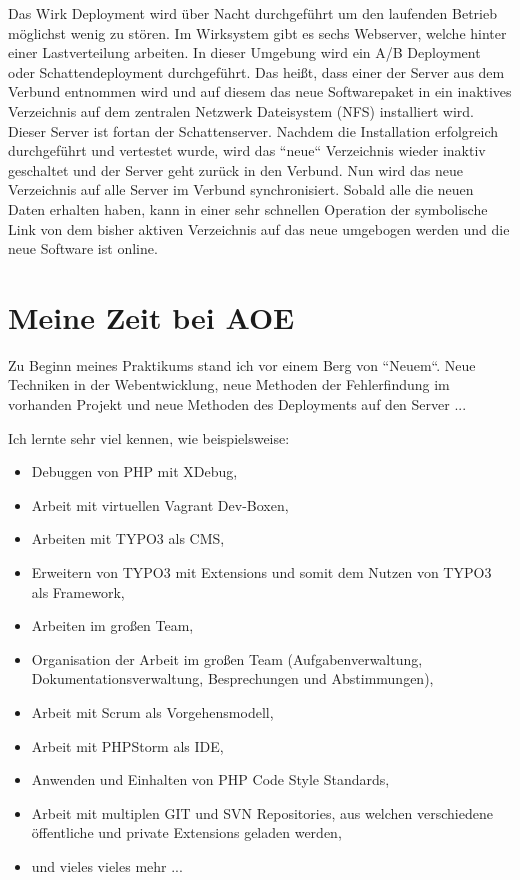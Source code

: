 \documentclass[11pt,a4paper]{article}
\begin{document}
Das Wirk Deployment wird über Nacht durchgeführt um den laufenden Betrieb möglichst wenig zu stören. Im Wirksystem gibt es sechs Webserver, welche hinter einer Lastverteilung arbeiten. In dieser Umgebung wird ein A/B Deployment oder Schattendeployment durchgeführt. Das heißt, dass einer der Server aus dem Verbund entnommen wird und auf diesem das neue Softwarepaket in ein inaktives Verzeichnis auf dem zentralen Netzwerk Dateisystem (NFS) installiert wird. Dieser Server ist fortan der Schattenserver. Nachdem die Installation erfolgreich durchgeführt und vertestet wurde, wird das “neue“ Verzeichnis wieder inaktiv geschaltet und der Server geht zurück in den Verbund. Nun wird das neue Verzeichnis auf alle Server im Verbund synchronisiert. Sobald alle die neuen Daten erhalten haben, kann in einer sehr schnellen Operation der symbolische Link von dem bisher aktiven Verzeichnis auf das neue umgebogen werden und die neue Software ist online.


\section{Meine Zeit bei AOE } \label{sec:pipeline}

Zu Beginn meines Praktikums stand ich vor einem Berg von “Neuem“.
Neue Techniken in der Webentwicklung,
neue Methoden der Fehlerfindung im vorhanden Projekt und
neue Methoden des Deployments auf den Server
...

Ich lernte sehr viel kennen, wie beispielsweise:

\begin{itemize} 
	\item Debuggen von PHP mit XDebug, 
	\item Arbeit mit virtuellen Vagrant Dev-Boxen, 
	\item Arbeiten mit TYPO3 als CMS, 
	\item Erweitern von TYPO3 mit Extensions und somit dem Nutzen von TYPO3 als Framework, 
	\item Arbeiten im großen Team, 
	\item Organisation der Arbeit im großen Team (Aufgabenverwaltung, Dokumentationsverwaltung, Besprechungen und Abstimmungen), 
	\item Arbeit mit Scrum als Vorgehensmodell, 
	\item Arbeit mit PHPStorm als IDE, 
	\item Anwenden und Einhalten von PHP Code Style Standards, 
	\item Arbeit mit multiplen GIT und SVN Repositories, aus welchen verschiedene öffentliche und private Extensions geladen werden, 
	\item und vieles vieles mehr ...
\end{itemize}
\end{document}
